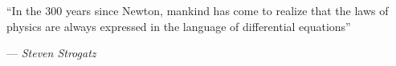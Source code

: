 \documentclass[12pt]{article}
\begin{document}

		\epigraph{``In the 300 years since Newton, mankind has come to realize that the laws of physics are always expressed in the language of differential equations''}{--- \textit{Steven Strogatz}}








%

%

\newpage

\appendix



\nocite{*}
\printbibliography
\end{document}
